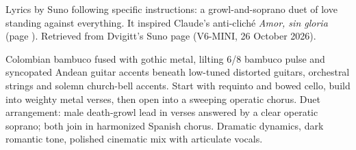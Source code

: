 
\label{sec:amor-contra-todo}
\begin{notes}
Lyrics by Suno following specific instructions: a growl-and-soprano duet of love standing against everything. It inspired Claude's anti-cliché \emph{Amor, sin gloria} (page \pageref{sec:amor-sin-gloria}). Retrieved from Dvigitt's Suno page (V6-MINI, 26 October 2026).
\end{notes}
\begin{style}
Colombian bambuco fused with gothic metal, lilting 6/8 bambuco pulse and syncopated Andean guitar accents beneath low-tuned distorted guitars, orchestral strings and solemn church-bell accents. Start with requinto and bowed cello, build into weighty metal verses, then open into a sweeping operatic chorus. Duet arrangement: male death-growl lead in verses answered by a clear operatic soprano; both join in harmonized Spanish chorus. Dramatic dynamics, dark romantic tone, polished cinematic mix with articulate vocals.
\end{style}
